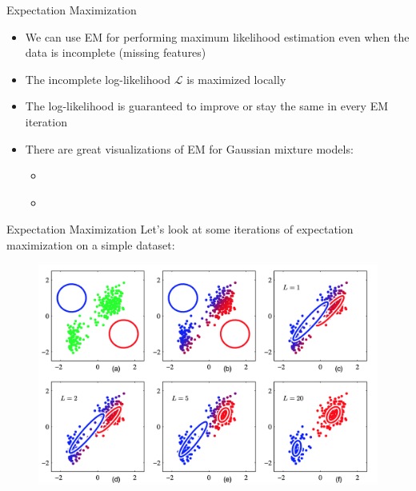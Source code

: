 \begin{frame}{Expectation Maximization}{}
	\begin{itemize}
		\item We can use EM for performing maximum likelihood estimation even when the data is incomplete (missing features)
		\item The incomplete log-likelihood $\mathcal{L}$ is maximized locally
		\item The log-likelihood is guaranteed to improve or stay the same in every EM iteration
		\item There are great visualizations of EM for Gaussian mixture models:
		\begin{itemize}
			\item \href{https://www.youtube.com/watch?v=l1W3BvjJnmY}{}
			\item \href{https://youtu.be/eXdGCO-2n90?t=2}{}
		\end{itemize}
	\end{itemize}
\end{frame}

\begin{frame}{Expectation Maximization}{}
	Let's look at some iterations of expectation maximization on a simple dataset:
	\begin{figure}
		\includegraphics[scale=0.45]{04_density_estimation/02_img/em}
	\end{figure}
\end{frame}


